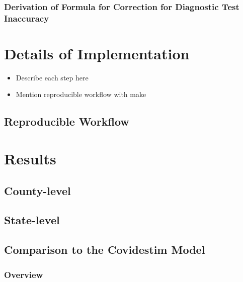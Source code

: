 \documentclass[12pt,twoside]{smiththesis}
\providecommand{\tightlist}{%
  \setlength{\itemsep}{0pt}\setlength{\parskip}{0pt}}
\begin{document}
\hypertarget{derivation-of-formula-for-correction-for-diagnostic-test-inaccuracy}{%
\subsection{Derivation of Formula for Correction for Diagnostic Test Inaccuracy}\label{derivation-of-formula-for-correction-for-diagnostic-test-inaccuracy}}

\hypertarget{details-of-implementation}{%
\chapter{Details of Implementation}\label{details-of-implementation}}
\begin{itemize}
\tightlist
\item
  Describe each step here
\item
  Mention reproducible workflow with make
\end{itemize}
\hypertarget{reproducible-workflow}{%
\section{Reproducible Workflow}\label{reproducible-workflow}}

\hypertarget{results}{%
\chapter{Results}\label{results}}

\hypertarget{county-level}{%
\section{County-level}\label{county-level}}

\hypertarget{state-level}{%
\section{State-level}\label{state-level}}

\hypertarget{comparison-to-the-covidestim-model}{%
\section{Comparison to the Covidestim Model}\label{comparison-to-the-covidestim-model}}

\hypertarget{overview-2}{%
\subsection{Overview}\label{overview-2}}
\end{document}
